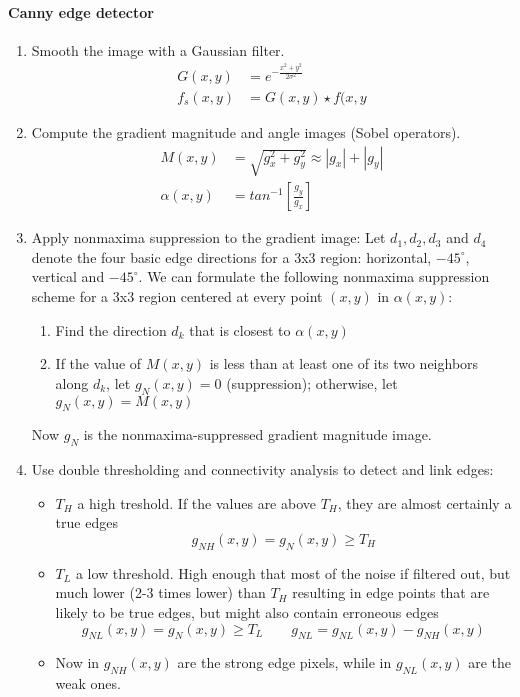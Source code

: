 \paragraph{Canny edge detector}
\begin{enumerate}
	\item Smooth the image with a Gaussian filter.
		\begin{align*}
			G(x,y)	&= e^{-\frac{x^2+y^2}{2\sigma^2}} \\
			f_s(x,y)&=G(x,y)\star f(x,y
		\end{align*}
	\item Compute the gradient magnitude and angle images (Sobel operators).
		\begin{align*}
			M(x,y) 		&= \sqrt{g_x^2+g_y^2} \approx |g_x| + |g_y| \\
			\alpha(x,y)	&= tan^{-1}\left[\frac{g_y}{g_x}\right]
		\end{align*}
	\item Apply nonmaxima suppression to the gradient image:
		Let $d_1, d_2, d_3$ and $d_4$ denote the four basic edge directions for a 3x3 region: horizontal, $-45^\circ$, vertical and $-45^\circ$. 
		We can formulate the following nonmaxima suppression scheme for a 3x3 region centered at every point $(x,y)$ in $\alpha(x,y)$:
		\begin{enumerate}
			\item Find the direction $d_k$ that is closest to $\alpha(x,y)$
			\item If the value of $M(x,y)$ is less than at least one of its two neighbors along $d_k$, let $g_N(x,y) = 0$ (suppression); otherwise, let $g_N(x,y) = M(x,y)$
		\end{enumerate}
		Now $g_N$ is the nonmaxima-suppressed gradient magnitude image.
	\item Use double thresholding and connectivity analysis to detect and link edges:
		\begin{itemize}
			\item $T_H$ a high treshold. If the values are above $T_H$, they are almost certainly a true edges
				\[
					g_{NH}(x,y) = g_N(x,y) \geq T_H
				\]
			\item $T_L$ a low threshold. High enough that most of the noise if filtered out, but much lower (2-3 times lower) than $T_H$ resulting in edge points that are likely to be true edges, but might also contain erroneous edges
				\[
					g_{NL}(x,y) = g_N(x,y) \geq T_L \qquad g_{NL} = g_{NL}(x,y) - g_{NH}(x,y)
				\]
			\item Now in $g_{NH}(x,y)$ are the strong edge pixels, while in $g_{NL}(x,y)$ are the weak ones.

\end{itemize}
\end{enumerate}
